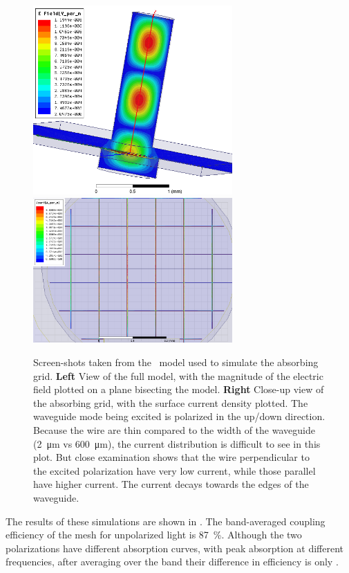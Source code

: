 \begin{figure}
\centering
\includegraphics[width=3in]{images/ch4-hfss-model.png}
\includegraphics[width=3in]{images/ch4-hfss-grid.png}
\caption{
  Screen-shots taken from the \HFSS\ model used to simulate the absorbing grid.
  \textbf{Left}
  View of the full model, with the magnitude of the electric field plotted on a plane bisecting the model.
  \textbf{Right}
  Close-up view of the absorbing grid, with the surface current density plotted.
  The waveguide mode being excited is polarized in the up/down direction.
  Because the wire are thin compared to the width of the waveguide (\SI{2}{\um} vs \SI{600}{\um}), the current distribution is difficult to see in this plot.
  But close examination shows that the wire perpendicular to the excited polarization have very low current, while those parallel have higher current.
  The current decays towards the edges of the waveguide.
}
\label{fig:ch4-hfss-model}
\end{figure}

The results of these simulations are shown in .
The band-averaged coupling efficiency of the mesh for unpolarized light is \SI{87}{\percent}.
Although the two polarizations have different absorption curves, with peak absorption at different frequencies, after averaging over the band their difference in efficiency is only .

